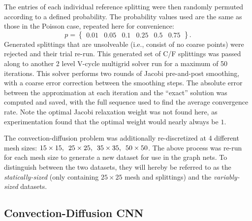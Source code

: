 \documentclass[review]{siamart190516}
\begin{document}
The entries of each individual reference splitting were then randomly permuted according to a defined probability.  The probability values used are the same as those in the Poisson case, repeated here for convenience:
%
\begin{equation} \label{eqn:conv_probabilities}
  p = \begin{Bmatrix} 0.01 & 0.05 & 0.1 & 0.25 & 0.5 & 0.75 \end{Bmatrix}.
\end{equation}
%
Generated splittings that are unsolveable (i.e., consist of no coarse points) were rejected and their trial re-run.  This generated set of C/F splittings was passed along to another 2 level V-cycle multigrid solver run for a maximum of 50 iterations.  This solver performs two rounds of Jacobi pre-and-post smoothing, with a coarse error correction between the smoothing steps.  The absolute error between the approximation at each iteration and the ``exact'' solution was computed and saved, with the full sequence used to find the average convergence rate.  Note the optimal Jacobi relaxation weight was not found here, as experimentation found that the optimal weight would nearly always be $1$.

The convection-diffusion problem was additionally re-discretized at 4 different mesh sizes: $15\times 15,\enskip 25\times 25,\enskip 35\times 35,\enskip 50\times 50$.  The above process was re-run for each mesh size to generate a new dataset for use in the graph nets.  To distinguish between the two datasets, they will hereby be referred to as the \textit{statically-sized} (only containing $25 \times 25$ mesh and splittings) and the \textit{variably-sized} datasets.

\subsection{Convection-Diffusion CNN}\label{subsec:conv_cnn}
\end{document}

